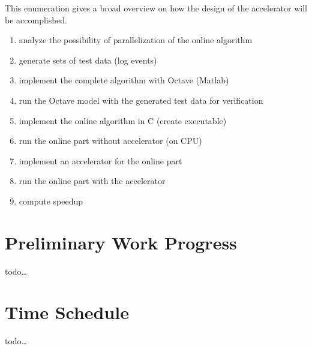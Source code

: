 \documentclass[12pt]{article} %
\begin{document}
This enumeration gives a broad overview on how the design of the accelerator
will be accomplished.
\begin{enumerate}
    \item analyze the possibility of parallelization of the online algorithm
    \item generate sets of test data (log events)
    \item implement the complete algorithm with Octave (Matlab)
    \item run the Octave model with the generated test data for verification
    \item implement the online algorithm in C (create executable)
    \item run the online part without accelerator (on CPU)
    \item implement an accelerator for the online part
    \item run the online part with the accelerator
    \item compute speedup
\end{enumerate}


\section{Preliminary Work Progress} %
todo\dots


\section{Time Schedule} %
todo\dots


%



\end{document}
